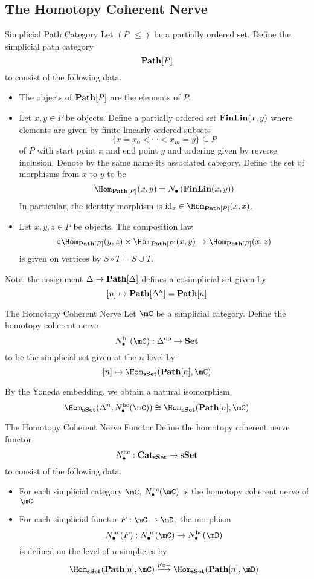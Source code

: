 \documentclass[a4paper]{article}
\begin{document}
\subsection{The Homotopy Coherent Nerve}
\begin{defn}{Simplicial Path Category}{} Let $(P,\leq)$ be a partially ordered set. Define the simplicial path category $$\bold{Path}[P]$$ to consist of the following data. 
\begin{itemize}
\item The objects of $\bold{Path}[P]$ are the elements of $P$. 
\item Let $x,y\in P$ be objects. Define a partially ordered set $\bold{FinLin}(x,y)$ where elements are given by finite linearly ordered subsets $$\{x=x_0<\cdots<x_m=y\}\subseteq P$$ of $P$ with start point $x$ and end point $y$ and ordering given by reverse inclusion. Denote by the same name its associated category. Define the set of morphisms from $x$ to $y$ to be $$\Hom_{\bold{Path}[P]}(x,y)=N_\bullet\left(\bold{FinLin}(x,y)\right)$$ In particular, the identity morphism is $\text{id}_x\in\Hom_{\bold{Path}[P]}(x,x)$. 
\item Let $x,y,z\in P$ be objects. The composition law $$\circ\Hom_{\bold{Path}[P]}(y,z)\times\Hom_{\bold{Path}[P]}(x,y)\to\Hom_{\bold{Path}[P]}(x,z)$$ is given on vertices by $S\circ T=S\cup T$. 
\end{itemize}
\end{defn}

Note: the assignment $\Delta\to\bold{Path}[\Delta]$ defines a cosimplicial set given by $$[n]\mapsto\bold{Path}[\Delta^n]=\bold{Path}[n]$$

\begin{defn}{The Homotopy Coherent Nerve}{} Let $\mC$ be a simplicial category. Define the homotopy coherent nerve $$N_\bullet^\text{hc}(\mC):\Delta^\text{op}\to\bold{Set}$$ to be the simplicial set given at the $n$ level by $$[n]\mapsto\Hom_\bold{sSet}(\bold{Path}[n],\mC)$$
\end{defn}

By the Yoneda embedding, we obtain a natural isomorphism $$\Hom_\bold{sSet}(\Delta^n,N_\bullet^\text{hc}(\mC))\cong\Hom_\bold{sSet}(\bold{Path}[n],\mC)$$

\begin{defn}{The Homotopy Coherent Nerve Functor}{} Define the homotopy coherent nerve functor $$N_\bullet^\text{hc}:\bold{Cat}_\bold{sSet}\to\bold{sSet}$$ to consist of the following data. 
\begin{itemize}
\item For each simplicial category $\mC$, $N_\bullet ^\text{hc}(\mC)$ is the homotopy coherent nerve of $\mC$
\item For each simplicial functor $F:\mC\to\mD$, the morphism $$N_\bullet^\text{hc}(F):N_\bullet^\text{hc}(\mC)\to N_\bullet^\text{hc}(\mD)$$ is defined on the level of $n$ simplicies by $$\Hom_\bold{sSet}(\bold{Path}[n],\mC)\overset{F\circ -}{\longrightarrow}\Hom_\bold{sSet}(\bold{Path}[n],\mD)$$
\end{itemize}
\end{defn}
\end{document}
